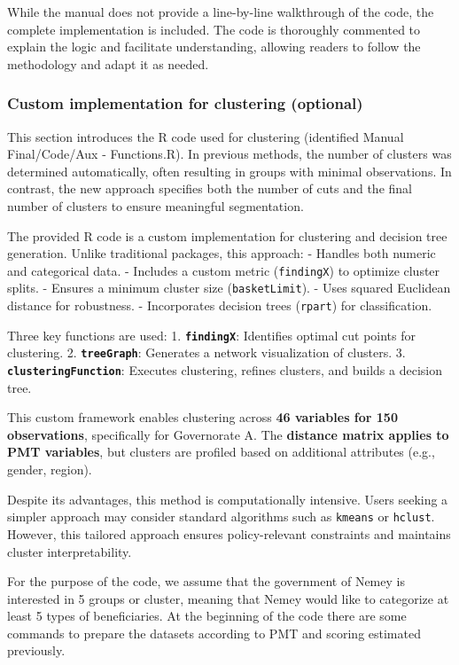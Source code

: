 \documentclass[
]{article}
\begin{document}
While the manual does not provide a line-by-line walkthrough of the
code, the complete implementation is included. The code is thoroughly
commented to explain the logic and facilitate understanding, allowing
readers to follow the methodology and adapt it as needed.

\subsubsection{Custom implementation for clustering
(optional)}\label{custom-implementation-for-clustering-optional}

This section introduces the R code used for clustering (identified
Manual Final/Code/Aux - Functions.R). In previous methods, the number of
clusters was determined automatically, often resulting in groups with
minimal observations. In contrast, the new approach specifies both the
number of cuts and the final number of clusters to ensure meaningful
segmentation.

The provided R code is a custom implementation for clustering and
decision tree generation. Unlike traditional packages, this approach: -
Handles both numeric and categorical data. - Includes a custom metric
(\texttt{findingX}) to optimize cluster splits. - Ensures a minimum
cluster size (\texttt{basketLimit}). - Uses squared Euclidean distance
for robustness. - Incorporates decision trees (\texttt{rpart}) for
classification.

Three key functions are used: 1. \textbf{\texttt{findingX}}: Identifies
optimal cut points for clustering. 2. \textbf{\texttt{treeGraph}}:
Generates a network visualization of clusters. 3.
\textbf{\texttt{clusteringFunction}}: Executes clustering, refines
clusters, and builds a decision tree.

This custom framework enables clustering across \textbf{46 variables for
150 observations}, specifically for Governorate A. The \textbf{distance
matrix applies to PMT variables}, but clusters are profiled based on
additional attributes (e.g., gender, region).

Despite its advantages, this method is computationally intensive. Users
seeking a simpler approach may consider standard algorithms such as
\texttt{kmeans} or \texttt{hclust}. However, this tailored approach
ensures policy-relevant constraints and maintains cluster
interpretability.

For the purpose of the code, we assume that the government of Nemey is
interested in 5 groups or cluster, meaning that Nemey would like to
categorize at least 5 types of beneficiaries. At the beginning of the
code there are some commands to prepare the datasets according to PMT
and scoring estimated previously.
\end{document}
